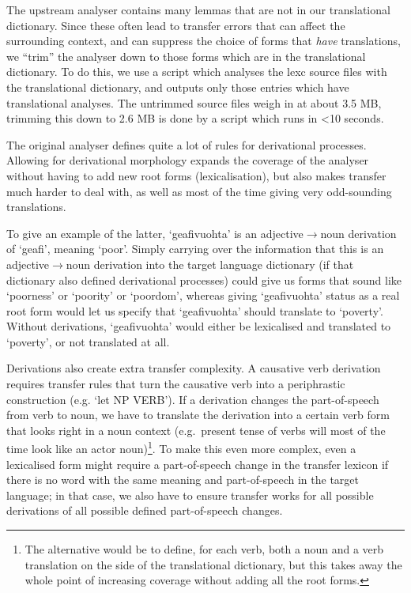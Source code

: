 The upstream analyser contains many lemmas that are not in our
translational dictionary. Since these often lead to transfer errors
that can affect the surrounding context, and can suppress the choice
of forms that \textit{have} translations, we ``trim'' the analyser
down to those forms which are in the translational dictionary. To do
this, we use a script which analyses the lexc source files with the
translational dictionary, and outputs only those entries which have
translational analyses. The untrimmed source files weigh in at about
3.5 MB, trimming this down to 2.6 MB is done by a script which runs in
<10 seconds.

The original analyser defines quite a lot of rules for derivational
processes. Allowing for derivational morphology expands the coverage
of the analyser without having to add new root forms (lexicalisation),
but also makes transfer much harder to deal with, as well as most of
the time giving very odd-sounding translations.

To give an example of the latter, `geafivuohta' is an
adjective$\rightarrow{}$noun derivation of `geafi', meaning `poor'.
Simply carrying over the information that this is an
adjective$\rightarrow{}$noun derivation into the target language
dictionary (if that dictionary also defined derivational processes)
could give us forms that sound like `poorness' or `poority' or
`poordom', whereas giving `geafivuohta' status as a real root form
would let us specify that `geafivuohta' should translate to `poverty'.
Without derivations, `geafivuohta' would either be lexicalised and
translated to `poverty', or not translated at all.

Derivations also create extra transfer complexity. A causative verb
derivation requires transfer rules that turn the causative verb into a
periphrastic construction (e.g. `let NP VERB'). If a derivation
changes the part-of-speech from verb to noun, we have to translate the
derivation into a certain verb form that looks right in a noun context
(e.g.~present tense of \nob verbs will most of the time look like an
actor noun)\footnote{The alternative would be to define, for each \sme{}
  verb, both a noun and a verb translation on the \nob side of the
  translational dictionary, but this takes away the whole point of
  increasing coverage without adding all the root forms.}. To make
this even more complex, even a lexicalised form might require a
part-of-speech change in the transfer lexicon if there is no word with
the same meaning and part-of-speech in the target language; in that
case, we also have to ensure transfer works for all possible
derivations of all possible defined part-of-speech changes.

